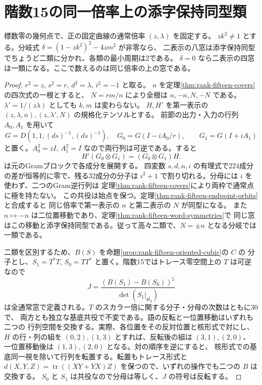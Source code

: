 \section{階数15の同一倍率上の添字保持同型類}
\label{sec:rank-fifteen-root-exchange}
\begin{theorem}\label{thm:rank-fifteen-root-exchange}
標数零の幾何点で、正の固定曲線の通常倍率 $(z,\lambda)$ を固定する。
$zk^2\ne1$ とする。分岐式 $\delta=(1-zk^2)^2-4zm^2$ が非零なら、
二表示の八窓は添字保持同型でちょうど二類に分かれ、各類の最小周期は2である。
$\delta=0$ なら二表示の四窓は一類になる。ここで数えるのは同じ倍率の上の窓である。
\end{theorem}
\begin{proof}
$r^2=z$, $s^2=r$, $d^2=\lambda$, $i^2=-1$ と取る。
$n$ を定理\ref{thm:rank-fifteen-covers}の四次式の一根とすると、
$N=rm/n$ により全根は $n,-n,N,-N$ である。
$\lambda'=1/(z\lambda)$ としても $k,m$ は変わらない。
$H,H'$ を第一表示の $(z,\lambda,n),(z,\lambda',N)$ の規格化テンソルとする。
前節の出力・入力の行列 $A_0,A_1$ を用いて
\[
 G=D(1,1,(ds)^{-1},(ds)^{-1}),\quad
 G_0=G(I-iA_0/r),\qquad G_1=G(I+iA_1)
\]
と置く。$A_0^2=zI$, $A_1^2=I$ なので両行列は可逆である。すると
\[
 H'(G_0\otimes G_1)=(G_0\otimes G_1)H .
\]
 は元のGramブロックで各成分を展開する。
四変数 $s,d,n,i$ の有理式で224成分の差が恒等的に零で、残る32成分の分子は
$i^2+1$ で割り切れる。分母には $i$ を使わず、二つのGram逆行列は
定理\ref{thm:rank-fifteen-covers}により両枠で通常点に極を持たない。
この共役は始点を保つ。定理\ref{thm:rank-fifteen-endpoint-orbits}と合成すると
同じ倍率で第一表示の $n$ と第二表示の $N$ が同型になる。
また $n\mapsto-n$ は二位置移動であり、定理\ref{thm:rank-fifteen-word-symmetries}で
同じ窓はこの移動と添字保持同型である。従って高々二類で、$N=\pm n$ となる分岐では一類である。

二類を区別するため、$B(S)$ を命題\ref{prop:rank-fifteen-oriented-cubic}の $C$ の
分子とし、$S_1=T^*T$, $S_0=TT^*$ と置く。階数15ではトレース零空間上の $T$ は可逆なので
\[
 J=\frac{(B(S_1)-B(S_0))^5}{\det(S_1|_{\mathfrak{sl}_4})}
\]
は全通常窓で定義される。$T$ のスカラー倍に関する分子・分母の次数はともに30で、
両方とも独立な基底共役で不変である。語の反転と一位置移動はいずれも二つの
行列空間を交換する。実際、各位置をその反対位置と核形式で対にし、
$H$ の行・列の組を $(0,2),(1,3)$ とすれば、反転後の組は $(3,1),(2,0)$、
一位置移動後は $(1,3),(2,0)$ となる。対の順序を逆にすると、
核形式での基底同一視を除いて行列を転置する。転置もトレース形式と
$d(X,Y,Z)=\operatorname{tr}((XY+YX)Z)$ を保つので、いずれの操作でも二つの $B$ は交換する。
$S_0$ と $S_1$ は共役なので分母は等しく、$J$ の符号は反転する。


\end{proof}
